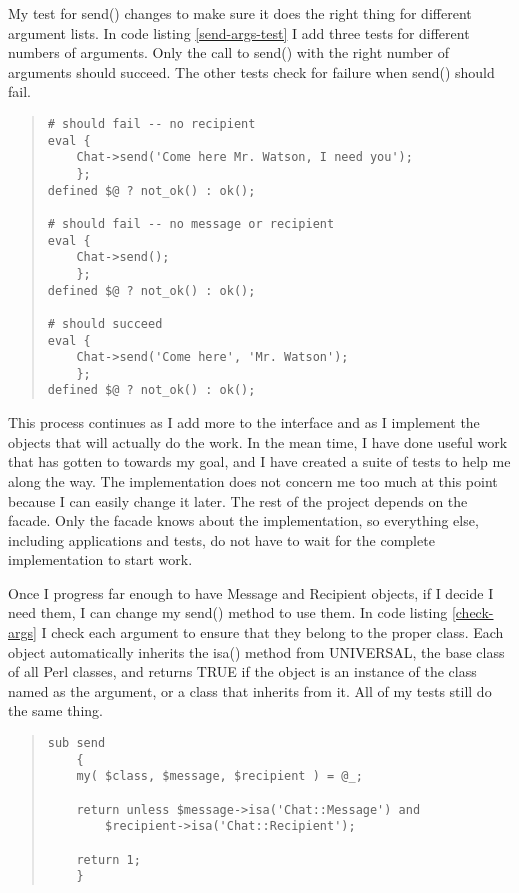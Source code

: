 My test for send() changes to make sure it does the right thing
for different argument lists.  In code listing \ref{send-args-test}
I add three tests for different numbers of arguments.  Only
the call to send() with the right number of arguments should
succeed.  The other tests check for failure when send() should
fail.

\begin{quote}
\begin{verbatim}
# should fail -- no recipient
eval {
	Chat->send('Come here Mr. Watson, I need you');
	};
defined $@ ? not_ok() : ok();

# should fail -- no message or recipient
eval {
	Chat->send();
	};
defined $@ ? not_ok() : ok();

# should succeed
eval {
	Chat->send('Come here', 'Mr. Watson');
	};
defined $@ ? not_ok() : ok();
\end{verbatim}
\end{quote}

This process continues as I add more to the interface and as I
implement the objects that will actually do the work.  In the mean
time, I have done useful work that has gotten to towards my goal, and
I have created a suite of tests to help me along the way.  The
implementation does not concern me too much at this point because I
can easily change it later.  The rest of the project depends on 
the facade. Only the facade knows about the implementation,
so everything else, including applications and tests, do not have to
wait for the complete implementation to start work.

Once I progress far enough to have Message and Recipient objects, if I
decide I need them, I can change my send() method to use them.  In
code listing \ref{check-args} I check each argument to ensure that
they belong to the proper class.  Each object automatically inherits
the isa() method from UNIVERSAL, the base class of all Perl classes,
and returns TRUE if the object is an instance of the class named as
the argument, or a class that inherits from it. All of my tests still
do the same thing.

\begin{quote}
\begin{verbatim}
sub send
	{
	my( $class, $message, $recipient ) = @_;
	
	return unless $message->isa('Chat::Message') and
		$recipient->isa('Chat::Recipient');
	
	return 1;
	}
\end{verbatim}
\end{quote}

